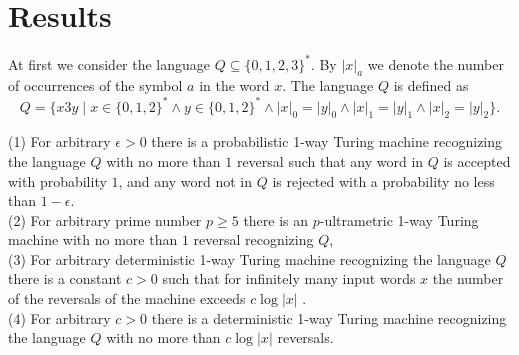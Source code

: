 \documentclass{llncs}
\begin{document}
\section{Results} 

At first we consider the language $Q \subseteq \{0,1,2,3\}^*$. By $|x|_a$ we denote the number of occurrences of the symbol $a$ in the word $x$.
The language $Q$ is defined as
$$
Q = \{ x3y \mid x \in \{0,1,2\}^* \wedge  y \in \{0,1,2\}^* \wedge  |x|_0 = |y|_0  \wedge |x|_1 = |y|_1 \wedge  |x|_2 = |y|_2 \}.
$$










\begin{theorem}
\label{Th7a}
(1) For arbitrary $\epsilon > 0$  there is a probabilistic 1-way Turing machine recognizing the language $Q$  with no more than $1$ reversal such that any word in $Q$ is accepted with probability $1$, 
and any word not in $Q$ is rejected with a probability no less than $1 - \epsilon $.\\
(2) For arbitrary prime number $p \geq 5$ there is an $p$-ultrametric 1-way Turing machine with no more than $1$ reversal recognizing $Q$,\\
(3) For arbitrary deterministic 1-way Turing machine recognizing the language $Q$  there is a constant $c > 0$ such that for infinitely many input words $x$ the number of the reversals of the machine 
exceeds $c \log |x|$ .\\
 (4) For arbitrary $c > 0$  there is a deterministic 1-way Turing machine recognizing the language $Q$ with no more than $c \log |x|$  reversals.
\end{theorem}
\end{document}
